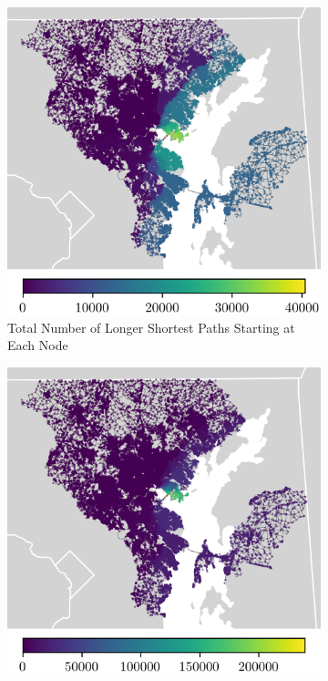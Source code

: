 \documentclass[11pt]{article}
\numberwithin{equation}{section} %
\numberwithin{figure}{section} %
\numberwithin{table}{section} %
\theoremstyle{definition}
\begin{document}
\begin{figure}[t!]
	\caption{Changes in shortest paths}
  \begin{subfigure}{0.49\textwidth}
    \centering
    \includegraphics[width=\textwidth]{maps/no_changed_paths.png}
    \caption{Total Number of Longer Shortest Paths Starting at Each Node}
  \end{subfigure}
  \begin{subfigure}{0.49\textwidth}
    \centering
    \includegraphics[width=\textwidth]{maps/dist_changed_paths.png}

\end{subfigure}
\end{figure}
\end{document}
